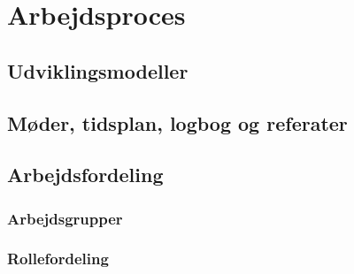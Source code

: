 \chapter{Arbejdsproces}

\section{Udviklingsmodeller}

\section{Møder, tidsplan, logbog og referater}

\section{Arbejdsfordeling}

\subsection{Arbejdsgrupper}

\subsection{Rollefordeling}
